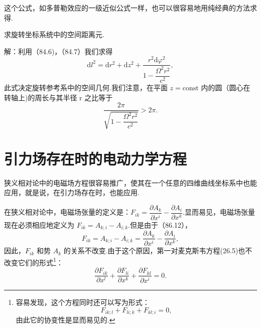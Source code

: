 这个公式，如多普勒效应的一级近似公式一样，也可以很容易地用纯经典的方法求得.

\begin{xiti}

\quad 求旋转坐标系统中的空间距离元.

解：利用（84.6)，（84.7）我们求得
\begin{equation*}
  \mathrm{d}l^2=\mathrm{d}r^2+\mathrm{d}z^2
  +\frac{r^2\mathrm{d}\varphi^2}{1-\dfrac{\varOmega^2r^2}{c^2}},
\end{equation*}
此式决定旋转参考系中的空间几何.我们注意，在平面 $z=\mathrm{const}$ 内的圆（圆心在转轴上)的周长与其半径 r 之比等于
\begin{equation*}
  \frac{2\pi}{\sqrt{1-\dfrac{\varOmega^2r^2}{c^2}}}>2\pi.
\end{equation*}

\end{xiti}

\section{引力场存在时的电动力学方程}

狭义相对论中的电磁场方程很容易推广，使其在一个任意的四维曲线坐标系中也能应用，就是说，在引力场存在时，也能应用.

在狭义相对论中，电磁场张量的定义是：$F_{ik}=\dfrac{\partial A_k}{\partial x^i}-\dfrac{\partial A_i}{\partial x^k}$.显而易见，电磁场张量现在必须相应地定义为 $F_{ik}=A_{k;i}-A_{i;k}$.但是由于（86.12），
\begin{equation}
  F_{ik}=A_{k;i}-A_{i;k}=\frac{\partial A_k}{\partial x^i}
  -\frac{\partial A_i}{\partial x^k},
\end{equation}
因此，$F_{ik}$ 和势 $A_k$ 的关系不改变.由于这个原因，第一对麦克斯韦方程(26.5)也不改变它们的形式\footnote{容易发现，这个方程同时还可以写为形式：
\begin{equation*}
  F_{ik;l}+F_{li;k}+F_{kl;i}=0,
\end{equation*}
由此它的协变性是显而易见的.}：
\begin{equation}
  \frac{\partial F_{ik}}{\partial x^l}
  +\frac{\partial F_{li}}{\partial x^k}
  +\frac{\partial F_{kl}}{\partial x^i}=0.
\end{equation}

